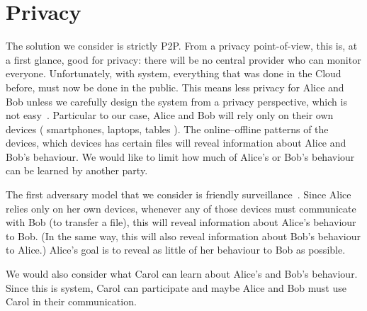 \section{Privacy}%
\label{Privacy}

The solution we consider is strictly \ac{P2P}.
From a privacy point-of-view, this is, at a first glance, good for privacy: 
there will be no central provider who can monitor everyone.
Unfortunately, with  system, everything that was done in the Cloud 
before, must now be done in the public.
This means less privacy for Alice and Bob unless we carefully design the system 
from a privacy perspective, which is not easy~\cite{DevilInMetadata}.
Particular to our case, Alice and Bob will rely only on their own devices (\eg 
smartphones, laptops, tables \etc).
The online--offline patterns of the devices, which devices has certain files 
\etc will reveal information about Alice and Bob's behaviour.
We would like to limit how much of Alice's or Bob's behaviour can be learned by 
another party.

The first adversary model that we consider is friendly 
surveillance~\cite{FriendlySurveillance}.
Since Alice relies only on her own devices, whenever any of those devices must 
communicate with Bob (\eg to transfer a file), this will reveal information 
about Alice's behaviour to Bob.
(In the same way, this will also reveal information about Bob's behaviour to 
Alice.)
Alice's goal is to reveal as little of her behaviour to Bob as possible.

We would also consider what Carol can learn about Alice's and Bob's behaviour.
Since this is  system, Carol can participate and maybe Alice and Bob 
must use Carol in their communication.

